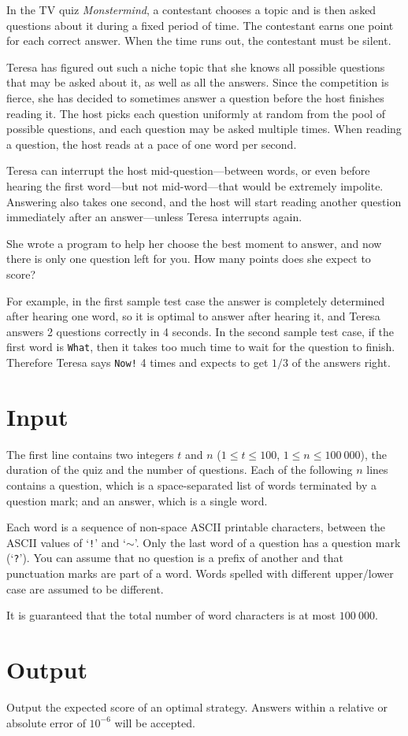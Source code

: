 

In the TV quiz \emph{Monstermind}, a contestant chooses a topic and is
then asked questions about it during a fixed period of time. The
contestant earns one point for each correct answer. When the time runs
out, the contestant must be silent.

Teresa has figured out such a niche topic that she knows all possible
questions that may be asked about it, as well as all the
answers. Since the competition is fierce, she has decided to sometimes
answer a question before the host finishes reading it. The host picks
each question uniformly at random from the pool of possible questions,
and each question may be asked multiple times. When reading a question,
the host reads at a pace of one word per second.

Teresa can interrupt the host mid-question---between words, or even before 
hearing the first word---but not
mid-word---that would be extremely impolite. Answering also takes one
second, and the host will start reading another question immediately
after an answer---unless Teresa interrupts again.

She wrote a program to help her choose the best moment to
answer, and now there is only one question left for you. How many
points does she expect to score?

For example, in the first sample test case the answer is completely
determined after hearing one word, so it is optimal to answer after
hearing it, and Teresa answers 2 questions correctly in 4 seconds. In the second
sample test case, if the first word is \texttt{What}, then it takes
too much time to wait for the question to finish. Therefore Teresa
says \texttt{Now!} 4 times and expects to get $1/3$ of the answers
right.

\section*{Input}
The first line contains two integers $t$ and $n$ ($1 \leq t \leq 100$,
$1 \leq n \leq 100\ 000$), the duration of the quiz and the
number of questions. Each of the following $n$ lines contains a
question, which is a space-separated list of words terminated by a
question mark; and an answer, which is a single word.

Each word is a sequence of non-space ASCII printable characters, between the ASCII values of
`\texttt{!}' and `$\sim$'. Only the last word of a question has a
question mark (`\texttt{?}'). You can assume that no question is a prefix of another and
that punctuation marks are part of a word. Words spelled with different upper/lower case are assumed
to be different.

It is guaranteed that the total number of word characters is at most $100\ 000$.

\section*{Output}
Output the expected score of an optimal strategy.
Answers within a relative or absolute error of $10^{-6}$ will be accepted.
